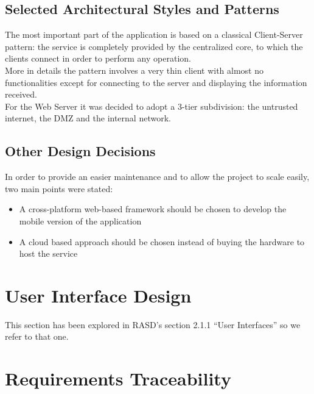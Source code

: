 \documentclass{article}
\begin{document}
\subsection{Selected Architectural Styles and Patterns}
The most important part of the application is based on a classical Client-Server pattern: the service is completely provided by the centralized core, to which the clients connect in order to perform any operation.\\
More in details the pattern involves a very thin client with almost no functionalities except for connecting to the server and displaying the information received.\\
For the Web Server it was decided to adopt a 3-tier subdivision: the untrusted internet, the DMZ and the internal network. %
\subsection{Other Design Decisions}
In order to provide an easier maintenance and to allow the project to scale easily, two main points were stated: 
\begin{itemize}
	\item A cross-platform web-based framework should be chosen to develop the mobile version of the application 
	\item A cloud based approach should be chosen instead of buying the hardware to host the service
\end{itemize}

\section{User Interface Design}
This section has been explored in RASD's section 2.1.1 ``User Interfaces'' so we refer to that one.

\section{Requirements Traceability}
\end{document}

